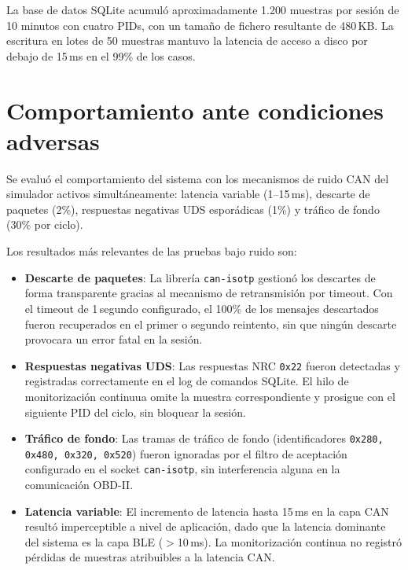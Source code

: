 La base de datos SQLite acumuló aproximadamente 1.200 muestras por sesión de 10 minutos con cuatro PIDs, con un tamaño de fichero resultante de 480\,KB. La escritura en lotes de 50 muestras mantuvo la latencia de acceso a disco por debajo de 15\,ms en el 99\% de los casos.


\section{Comportamiento ante condiciones adversas}
\label{sec:resultados_ruido}

Se evaluó el comportamiento del sistema con los mecanismos de ruido CAN del simulador activos simultáneamente: latencia variable (1--15\,ms), descarte de paquetes (2\%), respuestas negativas UDS esporádicas (1\%) y tráfico de fondo (30\% por ciclo).

Los resultados más relevantes de las pruebas bajo ruido son:

\begin{itemize}
    \item \textbf{Descarte de paquetes}: La librería \texttt{can-isotp} gestionó los descartes de forma transparente gracias al mecanismo de retransmisión por timeout. Con el timeout de 1\,segundo configurado, el 100\% de los mensajes descartados fueron recuperados en el primer o segundo reintento, sin que ningún descarte provocara un error fatal en la sesión.

    \item \textbf{Respuestas negativas UDS}: Las respuestas NRC \texttt{0x22} fueron detectadas y registradas correctamente en el log de comandos SQLite. El hilo de monitorización continuua omite la muestra correspondiente y prosigue con el siguiente PID del ciclo, sin bloquear la sesión.

    \item \textbf{Tráfico de fondo}: Las tramas de tráfico de fondo (identificadores \texttt{0x280, 0x480, 0x320, 0x520}) fueron ignoradas por el filtro de aceptación configurado en el socket \texttt{can-isotp}, sin interferencia alguna en la comunicación OBD-II.

    \item \textbf{Latencia variable}: El incremento de latencia hasta 15\,ms en la capa CAN resultó imperceptible a nivel de aplicación, dado que la latencia dominante del sistema es la capa BLE ($>$10\,ms). La monitorización continua no registró pérdidas de muestras atribuibles a la latencia CAN.
\end{itemize}

